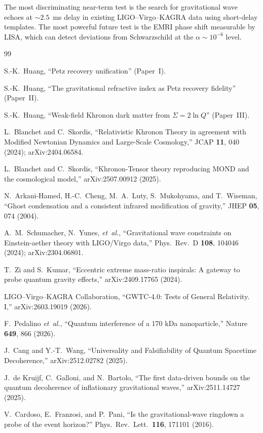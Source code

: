 \documentclass[prl,twocolumn,superscriptaddress,longbibliography]{revtex4-2}
\begin{document}
The most discriminating near-term test is the search for
gravitational wave echoes at $\sim 2.5$~ms delay in existing
LIGO--Virgo--KAGRA data using short-delay templates.  The most
powerful future test is the EMRI phase shift measurable by LISA,
which can detect deviations from Schwarzschild at the
$\alpha \sim 10^{-6}$ level.


\begin{thebibliography}{99}

S.-K.~Huang, ``Petz recovery unification'' (Paper~I).

S.-K.~Huang, ``The gravitational refractive index as Petz
recovery fidelity'' (Paper~II).

S.-K.~Huang, ``Weak-field Khronon dark matter from
$\Sigma = 2\ln Q$'' (Paper~III).

L.~Blanchet and C.~Skordis,
``Relativistic Khronon Theory in agreement with Modified
Newtonian Dynamics and Large-Scale Cosmology,''
JCAP \textbf{11}, 040 (2024);
arXiv:2404.06584.

L.~Blanchet and C.~Skordis,
``Khronon-Tensor theory reproducing MOND and the cosmological
model,''
arXiv:2507.00912 (2025).

N.~Arkani-Hamed, H.-C.~Cheng, M.~A.~Luty, S.~Mukohyama,
and T.~Wiseman,
``Ghost condensation and a consistent infrared modification
of gravity,''
JHEP \textbf{05}, 074 (2004).

A.~M.~Schumacher, N.~Yunes, \emph{et~al.},
``Gravitational wave constraints on Einstein-aether theory
with LIGO/Virgo data,''
Phys.\ Rev.\ D \textbf{108}, 104046 (2024);
arXiv:2304.06801.

T.~Zi and S.~Kumar,
``Eccentric extreme mass-ratio inspirals: A gateway to probe
quantum gravity effects,''
arXiv:2409.17765 (2024).

LIGO--Virgo--KAGRA Collaboration,
``GWTC-4.0: Tests of General Relativity. I,''
arXiv:2603.19019 (2026).

F.~Pedalino \emph{et~al.},
``Quantum interference of a 170 kDa nanoparticle,''
Nature \textbf{649}, 866 (2026).

J.~Cang and Y.-T.~Wang,
``Universality and Falsifiability of Quantum Spacetime
Decoherence,''
arXiv:2512.02782 (2025).

J.~de Kruijf, C.~Galloni, and N.~Bartolo,
``The first data-driven bounds on the quantum decoherence
of inflationary gravitational waves,''
arXiv:2511.14727 (2025).

V.~Cardoso, E.~Franzosi, and P.~Pani,
``Is the gravitational-wave ringdown a probe of the event
horizon?''
Phys.\ Rev.\ Lett.\ \textbf{116}, 171101 (2016).

\end{thebibliography}
\end{document}
